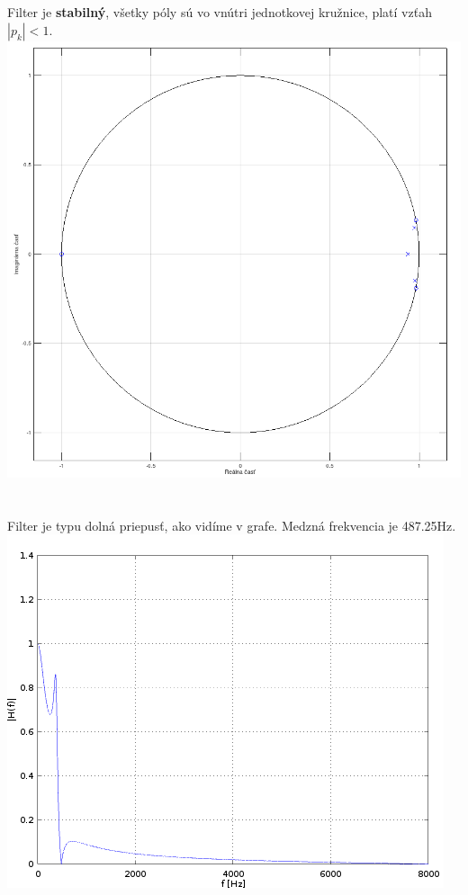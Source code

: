 \documentclass[a4paper,12pt,twocolumn]{article}
\begin{document}
\section{}
Filter je \textbf{stabilný}, všetky póly sú vo vnútri jednotkovej kružnice, platí vzťah $ |p_k| < 1 $.
\includegraphics[width=\linewidth]{3}
\section{}
Filter je typu dolná priepusť, ako vidíme v grafe. Medzná frekvencia je 487.25Hz.
\includegraphics[width=\linewidth]{4}
\end{document}
